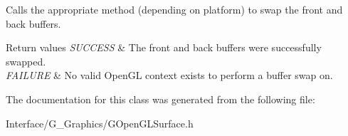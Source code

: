 Calls the appropriate method (depending on platform) to swap the front and back buffers. 


\begin{DoxyRetVals}{Return values}
{\em S\+U\+C\+C\+E\+SS} & The front and back buffers were successfully swapped. \\
\hline
{\em F\+A\+I\+L\+U\+RE} & No valid Open\+GL context exists to perform a buffer swap on. \\
\hline
\end{DoxyRetVals}


The documentation for this class was generated from the following file\+:\begin{DoxyCompactItemize}
\item 
Interface/\+G\+\_\+\+Graphics/G\+Open\+G\+L\+Surface.\+h\end{DoxyCompactItemize}
